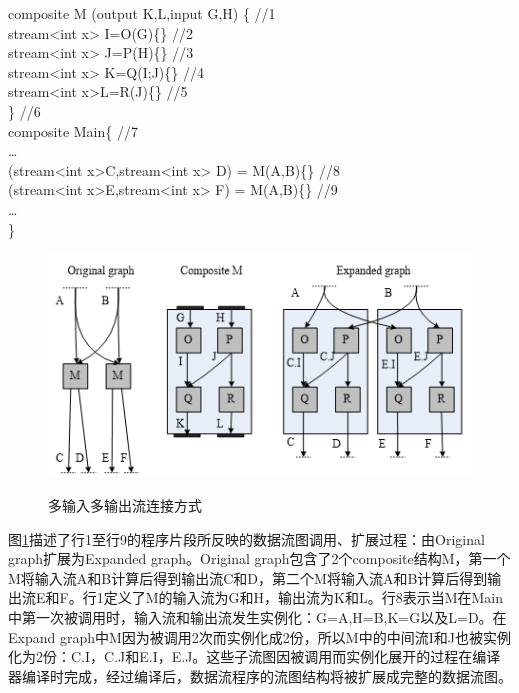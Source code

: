 \begin{algorithm}\label{algo:operator}
composite M (output K,L,input G,H) \{		//1\\
 \hspace*{1 pc} stream<int x> I=O(G)\{\}			//2\\
 \hspace*{1 pc} stream<int x> J=P(H)\{\}			//3\\
 \hspace*{1 pc} stream<int x> K=Q(I;J)\{\}			//4\\
 \hspace*{1 pc} stream<int x>L=R(J)\{\}			//5\\
\}									//6\\
composite Main\{						//7\\
 \hspace*{1 pc} …\\
 \hspace*{1 pc} (stream<int x>C,stream<int x> D) = M(A,B)\{\}	//8\\
 \hspace*{1 pc} (stream<int x>E,stream<int x> F) = M(A,B)\{\}	//9\\
 \hspace*{1 pc} …\\
\}
\end{algorithm}

\begin{figure}[htbp]
	\centering
	\includegraphics[width=1.0\textwidth]{Img/Chap_Application/Yu/multi.png}\\
	\caption{多输入多输出流连接方式}\label{fig:multi}
\end{figure}

图\ref{fig:multi}描述了行1至行9的程序片段所反映的数据流图调用、扩展过程：由Original graph扩展为Expanded graph。Original graph包含了2个composite结构M，第一个M将输入流A和B计算后得到输出流C和D，第二个M将输入流A和B计算后得到输出流E和F。行1定义了M的输入流为G和H，输出流为K和L。行8表示当M在Main中第一次被调用时，输入流和输出流发生实例化：G=A,H=B,K=G以及L=D。在Expand graph中M因为被调用2次而实例化成2份，所以M中的中间流I和J也被实例化为2份：C.I，C.J和E.I，E.J。这些子流图因被调用而实例化展开的过程在编译器编译时完成，经过编译后，数据流程序的流图结构将被扩展成完整的数据流图。

